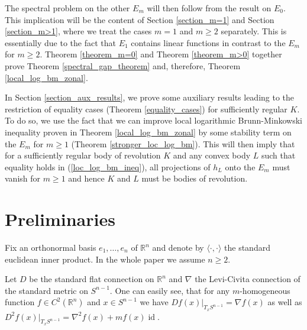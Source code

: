 \documentclass[12pt,twoside]{amsart}
\numberwithin{satz}{section}
\theoremstyle{definition}
\numberwithin{equation}{section}
\newcommand\R{\mathbb{R}}
\newcommand\id{\operatorname{id}}
\begin{document}
	The spectral problem on the other $E_m$ will then follow from the result on $E_0$. This implication will be the content of Section \ref{section_m=1} and Section \ref{section_m>1}, where we treat the cases $m=1$ and $m\geq 2$ separately. This is essentially due to the fact that $E_1$ contains linear functions in contrast to the $E_m$ for $m\geq 2$. Theorem \ref{theorem_m=0} and Theorem \ref{theorem_m>0} together prove Theorem \ref{spectral_gap_theorem} and, therefore, Theorem \ref{local_log_bm_zonal}.
	
	In Section \ref{section_aux_results}, we prove some auxiliary results leading to the restriction of equality cases (Theorem \ref{equality_cases}) for sufficiently regular $K$. To do so, we use the fact that we can improve local logarithmic Brunn-Minkowski inequality proven in Theorem \ref{local_log_bm_zonal} by some stability term on the $E_m$ for $m\geq 1$ (Theorem \ref{stronger_loc_log_bm}). This will then imply that for a sufficiently regular body of revolution $K$ and any convex body $L$ such that equality holds in (\ref{loc_log_bm_ineq}), all projections of $h_L$ onto the $E_m$ must vanish for $m\geq 1$ and hence $K$ and $L$ must be bodies of revolution. 
	
	\section{Preliminaries}
	
	Fix an orthonormal basis $e_1,\dots,e_n$ of $\R^n$ and denote by $\langle\cdot,\cdot\rangle$ the standard euclidean inner product. In the whole paper we assume $n\geq 2$.
	
	Let $D$ be the standard flat connection on $\R^n$ and $\nabla$ the Levi-Civita connection of the standard metric on $S^{n-1}$. One can easily see, that for any $m$-homogeneous function $f\in C^2(\R^n)$ and $x\in S^{n-1}$ we have $Df(x)|_{T_xS^{n-1}}=\nabla f(x)$ as well as $D^2f(x)|_{T_xS^{n-1}}=\nabla^2f(x)+mf(x)\id$.
	
\end{document}
